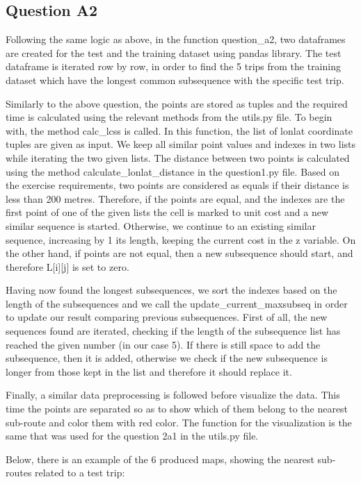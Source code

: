\documentclass[12pt]{article}
\begin{document}
	\subsection{Question A2}
	Following the same logic as above, in the function question\_a2, two dataframes are created for the test and the training dataset using pandas library. The test dataframe is iterated row by row, in order to find the 5 trips from the training dataset which have the longest common subsequence with the specific test trip.
	
	Similarly to the above question, the points are stored as tuples and the required time is calculated using the relevant methods from the utils.py file. To begin with, the method calc\_lcss is called. In this function, the list of lonlat coordinate tuples are given as input. We keep all similar point values and indexes in two lists while iterating the two given lists. The distance between two points is calculated using the method calculate\_lonlat\_distance in the question1.py file. Based on the exercise requirements, two points are considered as equals if their distance is less than 200 metres. Therefore, if the points are equal, and the indexes are the first point of one of the given lists the cell is marked to unit cost and a new similar sequence is started. Otherwise, we continue to an existing similar sequence, increasing by 1 its length, keeping the current cost in the z variable. On the other hand, if points are not equal, then a new subsequence should start, and therefore L[i][j] is set to zero.
	
	Having now found the longest subsequences, we sort the indexes based on the length of the subsequences and we call the update\_current\_maxsubseq in order to update our result comparing previous subsequences. First of all, the new sequences found are iterated, checking if the length of the subsequence list has reached the given number (in our case 5). If there is still space to add the subsequence, then it is added, otherwise we check if the new subsequence is longer from those kept in the list and therefore it should replace it.
	
	Finally, a similar data preprocessing is followed before visualize the data. This time the points are separated so as to show which of them belong to the nearest sub-route and color them with red color. The function for the visualization is the same that was used for the question 2a1 in the utils.py file.
	
	Below, there is an example of the 6 produced maps, showing the nearest sub-routes related to a test trip:
	
\end{document}
